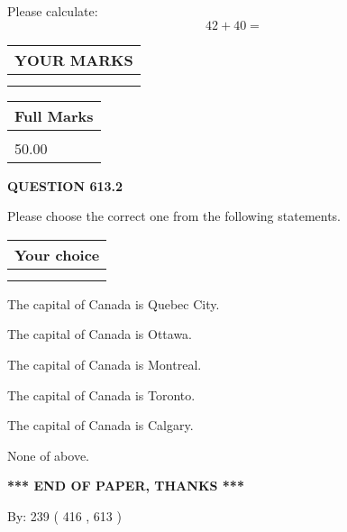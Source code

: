 \documentclass[12pt]{article}
\begin{document}
  
 
Please calculate:
\begin{equation}
42 +  %
40 = \nonumber
\end{equation}
 

 

 
  
\vspace{0.2in}
  
\noindent\begin{tabular}{|l|}
\hline
 YOUR MARKS  \\
\hline
 \\ 
 \\ 
\hline
\end{tabular}
\hspace{0.05in} \begin{tabular}{|l|}
\hline
 Full Marks  \\
\hline
 \\ 
50.00 \\
\hline
\end{tabular}
{\textbf{\Large{QUESTION
613.2 
}}}
  
  
Please choose the correct one from the following statements.
  
  
\noindent\hspace{3.0in} \begin{tabular}{|l|}
\hline
Your choice \\
\hline
 \\ 
 \\ 
\hline
\end{tabular}
  
  
 
 
The capital of Canada is Quebec City.
 
 
The capital of Canada is Ottawa.
 
 
The capital of Canada is Montreal.
 
 
The capital of Canada is Toronto.
 
 
The capital of Canada is Calgary.
 
 
 None of above.
 
 
   
   
 \vspace{0.2in}
 
   
   
   
   
\vspace{1.0in} 
{\textbf{\large{ *** END OF PAPER, THANKS *** }}} 
   
   
\hspace{1.0in} By: 
 239 ( 416 ,  613 )
   
   
 
 
\end{document}
